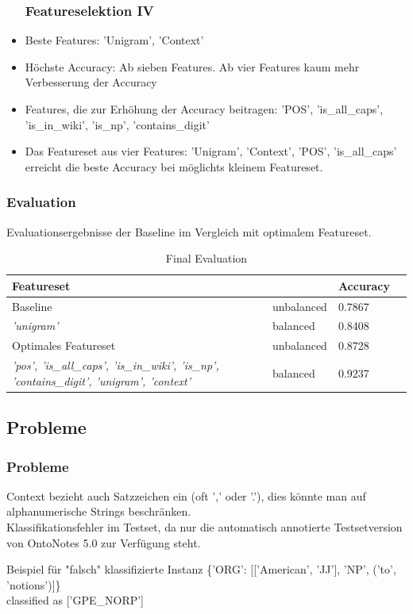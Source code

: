 \documentclass{beamer}
\begin{document}
	\begin{frame}
		\begin{itemize}
			\frametitle{Featureselektion IV}
			\item <+->Beste Features: 'Unigram', 'Context'\\
			\item <+->Höchste Accuracy: Ab sieben Features. Ab vier Features kaum mehr Verbesserung der Accuracy \\
			\item <+->Features, die zur Erhöhung der Accuracy beitragen: 'POS', 'is\_all\_caps', 'is\_in\_wiki', 'is\_np', 'contains\_digit'\\
			\item <+->Das Featureset aus vier Features: 'Unigram', 'Context', 'POS', 'is\_all\_caps' erreicht die beste Accuracy bei möglichts kleinem Featureset.
		\end{itemize}
	\end{frame}
	\begin{frame}
		\frametitle{Evaluation}
		Evaluationsergebnisse der Baseline im Vergleich mit optimalem Featureset.
				\begin{table}
					\centering
					\caption{Final Evaluation}

					\begin{tabular}{llll}
						Featureset & & Accuracy\\
						\toprule
						Baseline & unbalanced & 0.7867\\
						\tiny\color{blue}\textit{'unigram'} & balanced & 0.8408\\
						Optimales Featureset	 & unbalanced & 0.8728\\
						\tiny\color{blue}\textit{'pos', 'is\_all\_caps', 'is\_in\_wiki', 'is\_np', 'contains\_digit', 'unigram', 'context'}		 & balanced & 0.9237\\
						\bottomrule
					\end{tabular}
					\label{tab:allf2}
				\end{table}
	\end{frame}
		\subsection{Probleme}
		\begin{frame}
			\frametitle{Probleme}
			Context bezieht auch Satzzeichen ein (oft ',' oder '.'), dies könnte man auf alphanumerische Strings beschränken.\\
			
			Klassifikationsfehler im Testset, da nur die automatisch annotierte Testsetversion von OntoNotes 5.0 zur Verfügung steht.\\
			
			\begin{exampleblock}{Beispiel für "falsch" klassifizierte Instanz}
				\{'ORG': [['American', 'JJ'], 'NP', ('to', 'notions')]\}\\classified as ['GPE\_NORP']
			\end{exampleblock}
			
			
		\end{frame}
\end{document}
